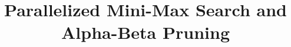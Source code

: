 \documentclass{sig-alternate-05-2015}
\begin{document}

%

\title{Parallelized Mini-Max Search and Alpha-Beta Pruning}
%
%
%
%
%
\end{document}
